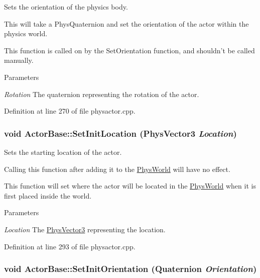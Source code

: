 Sets the orientation of the physics body. 

This will take a PhysQuaternion and set the orientation of the actor within the physics world. \par
 This function is called on by the SetOrientation function, and shouldn't be called manually. 
\begin{DoxyParams}{Parameters}
\item[{\em Rotation}]The quaternion representing the rotation of the actor. \end{DoxyParams}


Definition at line 270 of file physactor.cpp.

\hypertarget{classActorBase_ac118fc21f89d067d987d511b444f7d55}{
\subsubsection[{SetInitLocation}]{\setlength{\rightskip}{0pt plus 5cm}void ActorBase::SetInitLocation ({\bf PhysVector3} {\em Location})}}
\label{dd/d7b/classActorBase_ac118fc21f89d067d987d511b444f7d55}


Sets the starting location of the actor. 

Calling this function after adding it to the \hyperlink{classPhysWorld}{PhysWorld} will have no effect. \par
 This function will set where the actor will be located in the \hyperlink{classPhysWorld}{PhysWorld} when it is first placed inside the world. 
\begin{DoxyParams}{Parameters}
\item[{\em Location}]The \hyperlink{classPhysVector3}{PhysVector3} representing the location. \end{DoxyParams}


Definition at line 293 of file physactor.cpp.

\hypertarget{classActorBase_a968b3c8b29aac97b5240cf933783865b}{
\subsubsection[{SetInitOrientation}]{\setlength{\rightskip}{0pt plus 5cm}void ActorBase::SetInitOrientation ({\bf Quaternion} {\em Orientation})}}
\label{dd/d7b/classActorBase_a968b3c8b29aac97b5240cf933783865b}


